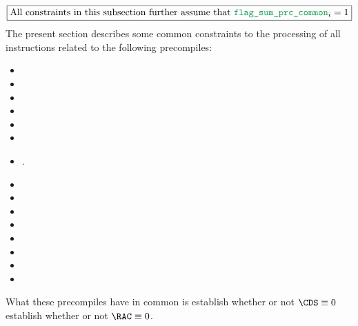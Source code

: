 \[
	\boxed{\text{All constraints in this subsection further assume that }
	\locPrcFlagSumCommon_{i} = 1
	}
\]
The present section describes some common constraints to the processing of all \oobMod{} instructions related to the following precompiles:
\begin{multicols}{3}
	\begin{itemize}
		\item {}
		\item {}
		\item {}
		\item {}
		\item {}
		\item {}
		\item {}.
		\item {}
        \item {}
        \item {}
        \item {}
        \item {}
        \item {}
        \item {}
		\item[\vspace{\fill}]
	\end{itemize}
\end{multicols}
\noindent What these precompiles have in common is
 establish whether or not $\CDS \equiv 0$
 establish whether or not $\RAC \equiv 0$.

